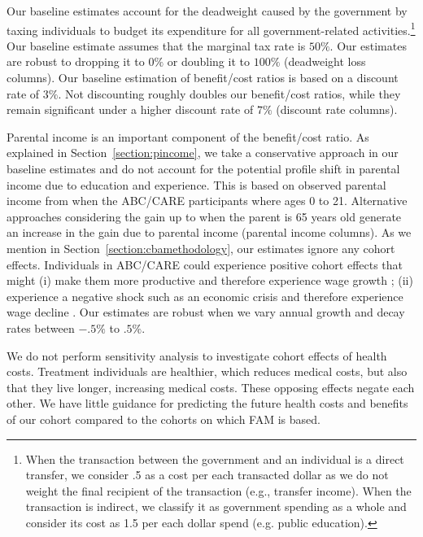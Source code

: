 Our baseline estimates account for the deadweight caused by the government by taxing individuals to budget its expenditure for all government-related activities.\footnote{When the transaction between the government and an individual is a direct transfer, we consider .5 as a cost per each transacted dollar as we do not weight the final recipient of the transaction (e.g., transfer income). When the transaction is indirect, we classify it as government spending as a whole and consider its cost as 1.5 per each dollar spend (e.g. public education).} Our baseline estimate assumes that the marginal tax rate is $50\%$. Our estimates are robust to dropping it to $0\%$ or doubling it to $100\%$ (deadweight loss columns). Our baseline estimation of benefit/cost ratios is based on a discount rate of $3\%$. Not discounting roughly doubles our benefit/cost ratios, while they remain significant under a higher discount rate of $7\%$ (discount rate columns).

Parental income is an important component of the benefit/cost ratio. As explained in Section~\ref{section:pincome}, we take a conservative approach in our baseline estimates and do not account for the potential profile shift in parental income due to education and experience. This is based on observed parental income from when the ABC/CARE participants where ages 0 to 21. Alternative approaches considering the gain up to when the parent is 65 years old generate an increase in the gain due to parental income (parental income columns). As we mention in Section~\ref{section:cbamethodology}, our estimates ignore any cohort effects. Individuals in ABC/CARE could experience positive cohort effects that might (i) make them more productive and therefore experience wage growth \citep{Lagakos_Moll_etal_2016_LifeCycle_NBER}; (ii) experience a negative shock such as an economic crisis and therefore experience wage decline \citep{Jarosch_2016_JobSecurity_Econometrica}. Our estimates are robust when we vary annual growth and decay rates between $-.5\%$ to $.5\%$.

We do not perform sensitivity analysis to investigate cohort effects of health costs. Treatment individuals are healthier, which reduces medical costs, but also that they live longer, increasing medical costs. These opposing effects negate each other. We have little guidance for predicting the future health costs and benefits of our cohort compared to the cohorts on which FAM is based.

